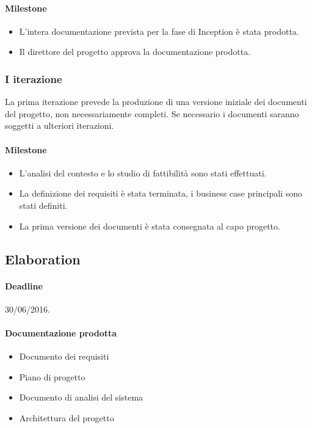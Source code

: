 \paragraph{Milestone}
\begin{itemize}
	\item L'intera documentazione prevista per la fase di Inception \`e stata prodotta.
	\item Il direttore del progetto approva la documentazione prodotta.
\end{itemize}

\subsubsection{I iterazione}

La prima iterazione prevede la produzione di una versione iniziale dei documenti del progetto, non necessariamente completi.
Se necessario i documenti saranno soggetti a ulteriori iterazioni.

\paragraph{Milestone}
\begin{itemize}
	\item L'analisi del contesto e lo studio di fattibilit\`a sono stati effettuati.
	\item La definizione dei requisiti \`e stata terminata, i business case principali sono stati definiti.
	\item La prima versione dei documenti \`e stata consegnata al capo progetto.
\end{itemize}

\subsection{Elaboration}

\paragraph{Deadline}
30/06/2016.

\paragraph{Documentazione prodotta}
\begin{itemize}
	\item Documento dei requisiti
	\item Piano di progetto
	\item Documento di analisi del sistema
	\item Architettura del progetto
\end{itemize}

